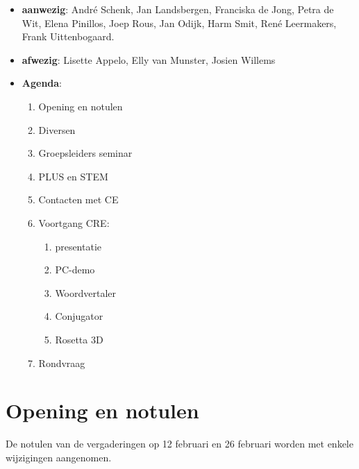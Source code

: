 
   \RosSupersedes{-}
   \MakeRosTitle



\begin{itemize}
  \item {\bf aanwezig}: Andr\'{e} Schenk, Jan Landsbergen, 
                     Franciska de Jong, Petra de Wit,  
                     Elena Pinillos, Joep Rous, Jan Odijk, Harm Smit,
                     Ren\'{e} Leermakers, Frank Uittenbogaard.

  \item {\bf afwezig}: Lisette Appelo, Elly van Munster, Josien Willems
  \item {\bf Agenda}:
    \begin{enumerate}
       \item Opening en notulen
       \item Diversen
       \item Groepsleiders seminar
       \item PLUS en STEM
       \item Contacten met CE
       \item Voortgang CRE:
         \begin{enumerate} 
  	 \item presentatie
         \item PC-demo
         \item Woordvertaler
         \item Conjugator
         \item Rosetta 3D
         \end{enumerate}
       \item Rondvraag
    \end{enumerate}
\end{itemize}

\section {Opening en notulen}
De notulen van de vergaderingen op 12 februari en 26 februari worden 
met enkele wijzigingen aangenomen.

